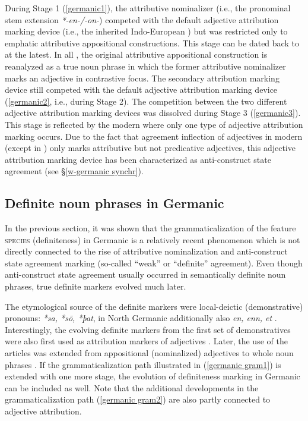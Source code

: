 {During Stage 1 (\ref{germanic1}), the attributive nominalizer (i.e., the pronominal stem extension \textit{*-en-/-on-}) competed with the default adjective attribution marking device (i.e., the inherited Indo-European ) but was restricted only to emphatic attributive appositional constructions. This stage can be dated back to  at the latest. In all , the original attributive appositional construction is reanalyzed as a true noun phrase in which the former attributive nominalizer marks an adjective in contrastive focus. The secondary attribution marking device still competed with the default adjective attribution marking device (\ref{germanic2}, i.e.,  during Stage 2). The competition between the two different adjective attribution marking devices was dissolved during Stage 3 (\ref{germanic3}). This stage is reflected by the modern  where only one type of adjective attribution marking occurs. Due to the fact that agreement inflection of adjectives in modern  (except in ) only marks attributive but not predicative adjectives, this adjective attribution marking device has been characterized as anti\hyp{}construct state agreement (see \S\ref{w-germanic synchr}).

\subsection{Definite noun phrases in Germanic}
In the previous section, it was shown that the grammaticalization of the feature \textsc{species} (definiteness) in Germanic is a relatively recent phenomenon which is not directly connected to the rise of attributive nominalization and anti\hyp{}construct state agreement marking (so-called “weak” or “definite” agreement). Even though anti\hyp{}construct state agreement usually occurred in semantically definite noun phrases, true definite markers evolved much later.

The etymological source of the definite markers were local-deictic (demonstrative) pronouns:  \textit{*sa, *sō, *þat}, in North Germanic additionally also \textit{en, enn, et} \citep[15]{heinrichs1954}. Interestingly, the evolving definite markers from the first set of  demonstratives were also first used as attribution markers of adjectives \citep{gamillscheg1937, nocentini1996}. Later, the use of the articles was extended from appositional (nominalized) adjectives to whole noun phrases \citep[63]{philippi1997}. If the grammaticalization path illustrated in (\ref{germanic gram1}) is extended with one more stage, the evolution of definiteness marking in Germanic can be included as well. Note that the additional developments in the grammaticalization path (\ref{germanic gram2}) are also partly connected to adjective attribution.

}
